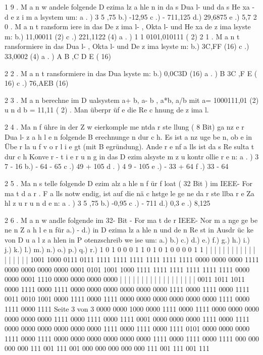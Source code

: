 \documentclass[12pt,a4paper]{scrreprt}
\begin{document}
1 9 . M a n w andele folgende D ezima lz a hle n in da s Dua l- und da s He xa -
d e z i m a lsystem um:
a . ) 3 5 ,75
b.) -12,95
c .) - 711,125
d.) 29,6875
e .) 5,7
2 0 . M a n t ransform iere in das De z ima l- , Okta l- und He xa de z ima lsyste m:
b.) 11,00011 (2)
c .) 221,1122 (4)
a . ) 1 1 0101,010111 ( 2)
2 1 . M a n t ransformiere in das Dua l- , Okta l- und De z ima lsyste m:
b.) 3C,FF (16)
c .) 33,0002 (4)
a . ) A B ,C D E ( 16)

2 2 . M a n t ransformiere in das Dua lsyste m:
b.) 0,0C3D (16)
a . ) B 3C ,F E ( 16)
c .) 76,AEB (16)

2 3 . M a n berechne im D ualsystem a+ b, a- b , a*b, a/b mit a= 1000111,01 (2)
u n d b = 11,11 ( 2) . Man überpr üf e die Re c hnung de z ima l.

2 4 . Ma n f ühre in der Z w eierkomple me ntda r ste llung ( 8 Bit) ga nz e r Dua l-
z a h l e n folgende B erechnunge n dur c h. Es ist a nz uge be n, ob e in Übe r la u f
v o r l i e gt (mit B egründung). Ande r e nf a lls ist da s Re sulta t dur c h Konve r -
t i e r u n g in das D ezim alsyste m z u kontr ollie r e n:
a . ) 3 7 - 16
b.) - 64 - 65
c .) 49 + 105
d . ) 4 9 - 105
e .) - 33 + 64
f .) 33 - 64

2 5 . Ma n s telle folgende D ezim alz a hle n f ür f loat ( 32 Bit ) im IEEE- For ma t
d a r . F a lls notw endig, ist auf die nä c hstge le ge ne da r ste llba r e Za hl z u
r u n d e n:
a . ) 3 5 ,75
b.) -0,95
c .) - 711
d.) 0,3 e .) 8,125

2 6 . M a n w andle folgende im 32- Bit - For ma t de r IEEE- Nor m a nge ge be ne n
Z a h l e n für a.) - d.) in D ezima lz a hle n und de n Re st in Ausdr üc ke von
D u a l z a hlen in P otenzschreib we ise um:
a.)
b.)
c.)
d.)
e.)
f.)
g.)
h.)
i.)
j.)
k.)
l.)
m.)
n.)
o.)
p.)
q.)
r.)
1
0
1
0
0
0
1
1
0
1
0
1
0
0
0
0
1
1
|
|
|
|
|
|
|
|
|
|
|
|
|
|
|
|
|
|
1001
1000
0111
0111
1111
1111
1111
1111
1111
1111
0000
0000
0000
1111
0000
0000
0000
0000
0001
0101
1001
1000
1111
1111
1111
1111
1111
1111
0000
0000
0001
1110
0000
0000
0000
0000
|
|
|
|
|
|
|
|
|
|
|
|
|
|
|
|
|
|
0011
1011
1011
0000
1111
0000
1111
0000
0000
0000
0000
0000
0000
1111
0000
1111
0000
1111
0011
0010
1001
0000
1111
0000
1111
0000
0000
0000
0000
0000
0000
1111
0000
1111
0000
1111
Seite 3 von 3
0000
0000
1000
0000
1111
0000
1111
0000
0000
0000
0000
0000
0000
1111
0000
1111
0000
1111
0001
0000
0000
0000
1111
0000
1111
0000
0000
0000
0000
0000
0000
1111
0000
1111
0000
1111
0101
0000
0000
0000
1111
0000
1111
0000
0000
0000
0000
0000
0000
1111
0000
1111
0000
1111
000
000
000
000
111
001
111
001
000
000
000
000
000
111
001
111
001
111
\end{document}
